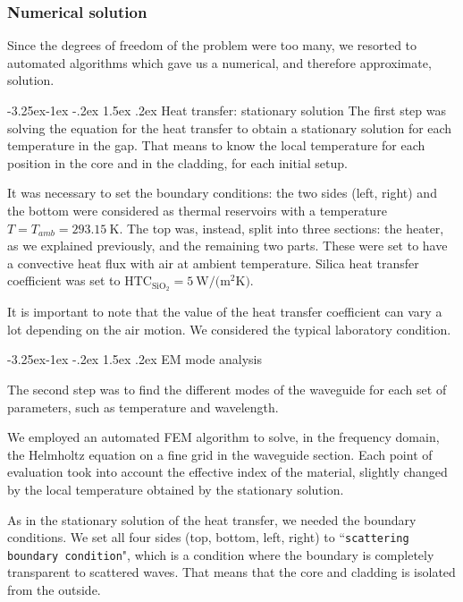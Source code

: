 \documentclass[12pt,a4paper,twoside]{article}
\makeatletter
\renewcommand\paragraph{
   \@startsection{paragraph}{4}{\z@}%
   {-3.25ex\@plus -1ex \@minus -.2ex}%
   {1.5ex \@plus .2ex}%
   {\normalfont\normalsize\bfseries}}
\makeatother
\begin{document}
\subsubsection{Numerical solution}
Since the degrees of freedom of the problem were too many, we resorted to automated algorithms which gave us a numerical, and therefore approximate, solution.

\paragraph{Heat transfer: stationary solution}
The first step was solving the equation for the heat transfer to obtain a stationary solution for each temperature in the gap.
That means to know the local temperature for each position in the core and in the cladding, for each initial setup.

It was necessary to set the boundary conditions: the two sides (left, right) and the bottom were considered as thermal reservoirs with a temperature $T = T_{amb} = \SI{293.15}{\K}$.
The top was, instead, split into three sections: the heater, as we explained previously, and the remaining two parts.
These were set to have a convective heat flux with air at ambient temperature.
Silica heat transfer coefficient was set to $\mathrm{HTC}_{\mathrm{SiO}_2} = \SI{5}{\W\per(\m^2\K)}$.

It is important to note that the value of the heat transfer coefficient can vary a lot depending on the air motion.
We considered the typical laboratory condition.

\paragraph{EM mode analysis}

The second step was to find the different modes of the waveguide for each set of parameters, such as temperature and wavelength.

We employed an automated FEM algorithm to solve, in the frequency domain, the Helmholtz equation on a fine grid in the waveguide section.
Each point of evaluation took into account the effective index of the material, slightly changed by the local temperature obtained by the stationary solution.

As in the stationary solution of the heat transfer, we needed the boundary conditions.
We set all four sides (top, bottom, left, right) to ``\texttt{scattering boundary condition}", which is a condition where the boundary is completely transparent to scattered waves.
That means that the core and cladding is isolated from the outside.
\end{document}
